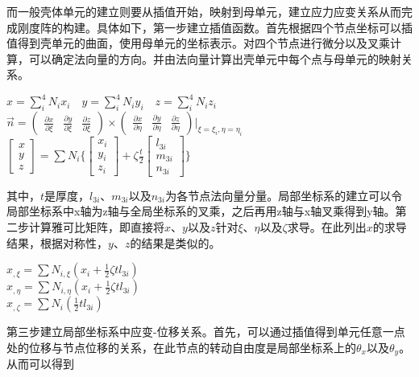 \documentclass[forprint]{WHUBachelor}
\begin{document}
而一般壳体单元的建立则要从插值开始，映射到母单元，建立应力应变关系从而完成刚度阵的构建。具体如下，第一步建立插值函数。首先根据四个节点坐标可以插值得到壳单元的曲面，使用母单元的坐标表示。对四个节点进行微分以及叉乘计算，可以确定法向量的方向。并由法向量计算出壳单元中每个点与母单元的映射关系。
\begin{center}
$x=\sum_i^4 N_ix_i\quad y=\sum_i^4 N_iy_i\quad z=\sum_i^4 N_iz_i$\\
$\overrightarrow n=(\begin{matrix}\frac{\partial x}{\partial \xi}&\frac{\partial y}{\partial \xi}&\frac{\partial z}{\partial \xi}\end{matrix})\times (\begin{matrix}\frac{\partial x}{\partial \eta}&\frac{\partial y}{\partial \eta}&\frac{\partial z}{\partial \eta}\end{matrix})|_{\xi=\xi_i,\eta=\eta_i}$\\
$\left[\begin{matrix}x\\y\\z\end{matrix}\right]=\sum N_i\{\left[\begin{matrix}x_i\\y_i\\z_i\end{matrix}\right]+\zeta\frac{t}{2}\left[\begin{matrix}l_{3i}\\m_{3i}\\n_{3i}\end{matrix}\right]\}$
\end{center}
其中，$t$是厚度，$l_{3i}$、$m_{3i}$以及$n_{3i}$为各节点法向量分量。局部坐标系的建立可以令局部坐标系中x轴为z轴与全局坐标系的叉乘，之后再用z轴与x轴叉乘得到y轴。第二步计算雅可比矩阵，即直接将$x$、$y$以及$z$针对$\xi$、$\eta$以及$\zeta$求导。在此列出$x$的求导结果，根据对称性，$y$、$z$的结果是类似的。
\begin{center}
$x_{,\xi}=\sum N_{i,\xi}(x_i+\frac{1}{2}\zeta tl_{3i})$\\
$x_{,\eta}=\sum N_{i,\eta}(x_i+\frac{1}{2}\zeta tl_{3i})$\\
$x_{,\zeta}=\sum N_i(\frac{1}{2}tl_{3i})$
\end{center}
第三步建立局部坐标系中应变-位移关系。首先，可以通过插值得到单元任意一点处的位移与节点位移的关系，在此节点的转动自由度是局部坐标系上的$\theta_x$以及$\theta_y$。从而可以得到
\end{document}

